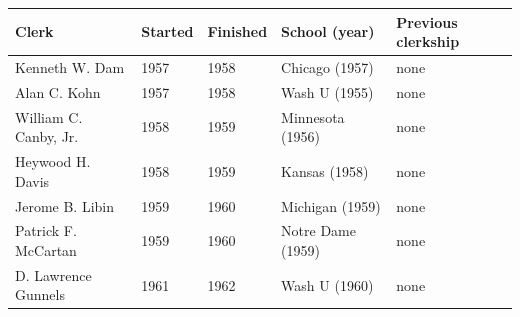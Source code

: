 \documentclass{article}
\begin{document}
\begin{tabular}{lllll}
\toprule
Clerk & Started & Finished & School (year) & Previous clerkship \\
\midrule
Kenneth W. Dam & 1957 & 1958 & Chicago (1957) & none \\
Alan C. Kohn & 1957 & 1958 & Wash U (1955) & none \\
William C. Canby, Jr. & 1958 & 1959 & Minnesota (1956) & none \\
Heywood H. Davis & 1958 & 1959 & Kansas (1958) & none \\
Jerome B. Libin & 1959 & 1960 & Michigan (1959) & none \\
Patrick F. McCartan & 1959 & 1960 & Notre Dame (1959) & none \\
D. Lawrence Gunnels & 1961 & 1962 & Wash U (1960) & none \\
\bottomrule
\end{tabular}
\end{document}
